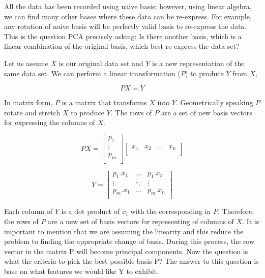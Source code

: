 All the data has been recorded using naive basis; however, using linear algebra, we can find many other bases where these data can be re-express. For example, any rotation of naive basis will be perfectly valid basis to re-express the data. This is the question PCA precisely asking: Is there another basis, which is a linear combination of the original basis, which best re-express the data set?

Let us assume $X$ is our original data set and $Y$ is a new representation of the same data set.  We can perform a linear transformation ($P$) to produce $Y$ from $X$,

\begin{equation}
PX = Y
\label{eq:p}
\end{equation}

In matrix form, $P$ is a matrix that transforms $X$ into $Y$. Geometrically speaking $P$ rotate and stretch $X$ to produce $Y$. The rows of $P$ are a set of new basis vectors for expressing the columns of $X$.

\begin{equation}
%
    PX =
	\begin{bmatrix}
    		p_{1}  \\
		\vdots \\
		p_{m}  \\
	\end{bmatrix}
	\begin{bmatrix}
    		x_{1} & x_{2} & \dots  & x_{n} \\
	\end{bmatrix}
%
\label{eq:px}
\end{equation}

\begin{equation}
%
    Y =
	\begin{bmatrix}
    		p_{1}.x_{1} & \dots & p_{1}.x_{n} \\
		\vdots & \ddots & \vdots \\
		p_{m}.x_{1} & \dots & p_{m}.x_{n} \\
	\end{bmatrix}
%
\label{eq:y}
\end{equation}

Each column of $Y$ is a dot product of $x_i$ with the corresponding in $P$. Therefore, the rows of $P$ are a new set of basis vectors for representing of columns of $X$. 
It is important to mention that we are assuming the linearity and this reduce the problem to finding the appropriate change of basis. During this process, the row vector in the matrix P will become principal components. Now the question is what the criteria to pick the best possible basis P? The answer to this question is base on what features we would like Y to exhibit. 

